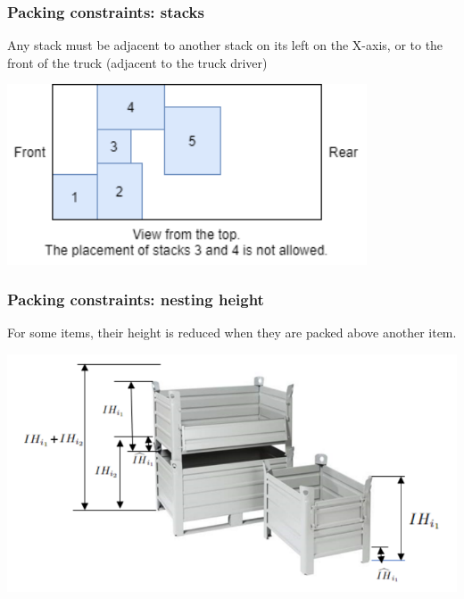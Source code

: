 \documentclass[10pt]{beamer}
\begin{document}
\begin{frame}
  \frametitle{Packing constraints: stacks}

  Any stack must be adjacent to another stack on its left on the X-axis, or to the front of the truck (adjacent to the truck driver)

  \bigskip

  \begin{center}
    \includegraphics[width=0.8\textwidth]{img/adjacent_stacks.png}
  \end{center}
  
\end{frame}

\begin{frame}
  \frametitle{Packing constraints: nesting height}

  For some items, their height is reduced when they are packed above another item.

  \begin{center}
    \includegraphics[width=\textwidth]{img/nesting_height.png}
  \end{center}
  
\end{frame}
\end{document}
